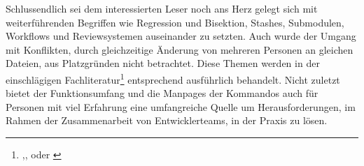 Schlussendlich sei dem interessierten Leser noch ans Herz gelegt sich mit
weiterführenden Begriffen wie Regression und Bisektion, Stashes, Submodulen,
Workflows und Reviewsystemen auseinander zu setzten. Auch wurde der Umgang mit
Konflikten, durch gleichzeitige Änderung von mehreren Personen an gleichen
Dateien, aus Platzgründen nicht betrachtet. Diese Themen werden in der
einschlägigen Fachliteratur\footnote{\cite{gitosp},\cite{progit},\cite{gitwf}
oder \cite{cd}} entsprechend ausführlich behandelt. Nicht zuletzt bietet der
Funktionsumfang und die Manpages der Kommandos auch für Personen mit viel
Erfahrung eine umfangreiche Quelle um Herausforderungen, im Rahmen der
Zusammenarbeit von Entwicklerteams, in der Praxis zu lösen.
